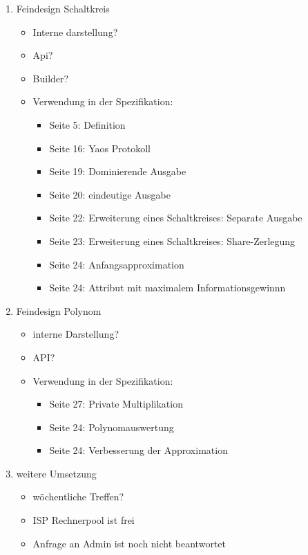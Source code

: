 \documentclass{article}
\begin{document}
\begin{enumerate}
\item Feindesign Schaltkreis
    \begin{itemize}
    \item Interne darstellung?
    \item Api?
    \item Builder?
    \item Verwendung in der Spezifikation:
        \begin{itemize}
            \item Seite 5: Definition
            \item Seite 16: Yaos Protokoll
            \item Seite 19: Dominierende Ausgabe
            \item Seite 20: eindeutige Ausgabe
            \item Seite 22: Erweiterung eines Schaltkreises: Separate Ausgabe
            \item Seite 23: Erweiterung eines Schaltkreises: Share-Zerlegung
            \item Seite 24: Anfangsapproximation
            \item Seite 24: Attribut mit maximalem Informationsgewinnn
        \end{itemize}
    \end{itemize}

\item Feindesign Polynom
    \begin{itemize}
        \item interne Darstellung?
        \item API?
        \item Verwendung in der Spezifikation:
            \begin{itemize}
                \item Seite 27: Private Multiplikation
                \item Seite 24: Polynomauswertung
                \item Seite 24: Verbesserung der Approximation
            \end{itemize}
    \end{itemize}

\item weitere Umsetzung
    \begin{itemize}
        \item w\"ochentliche Treffen?
        \item ISP Rechnerpool ist frei
        \item Anfrage an Admin ist noch nicht beantwortet
    \end{itemize}


\end{enumerate}
\end{document}
